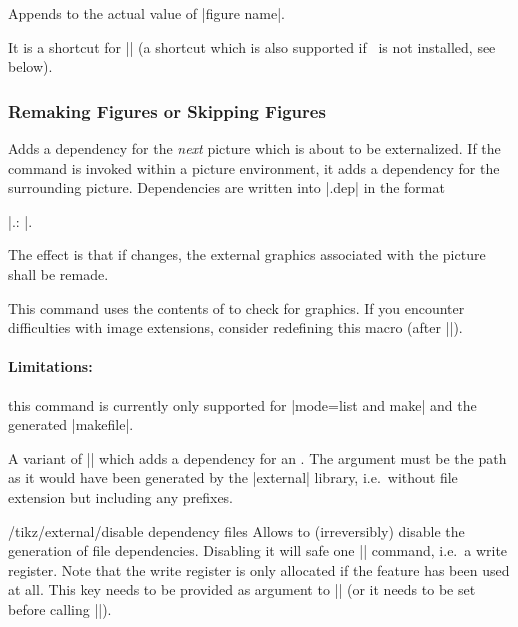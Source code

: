 {\begin{command}{\tikzappendtofigurename{}}
    Appends  to the actual value of |figure name|.

    It is a shortcut for ||
    (a shortcut which is also supported if \tikzname\ is not installed, see
    below).
\end{command}


\subsubsection{Remaking Figures or Skipping Figures}

\begin{command}{\tikzpicturedependsonfile{}}
    Adds a dependency for the \emph{next} picture which is about to be
    externalized. If the command is invoked within a picture environment, it
    adds a dependency for the surrounding picture. Dependencies are written
    into |.dep| in the format

    |.\tikzexternalimgextension: |.

    The effect is that if  changes, the external graphics
    associated with the picture shall be remade.

    This command uses the contents of
    \declareandlabel{\tikzexternalimgextension} to check for graphics. If you
    encounter difficulties with image extensions, consider redefining this
    macro (after |\tikzexternalize|).

    \paragraph{Limitations:}
    this command is currently only supported for |mode=list and make| and the
    generated |makefile|.
\end{command}

\begin{command}{\tikzexternalfiledependsonfile{}}
    A variant of |\tikzpicturedependsonfile| which adds a dependency for an
    . The argument  must be the
    path as it would have been generated by the |external| library, i.e.\ without
    file extension but including any prefixes.
\end{command}

\begin{key}{/tikz/external/disable dependency files}
    Allows to (irreversibly) disable the generation of file dependencies.
    Disabling it will safe one |\newwrite| command, i.e.\ a write register.
    Note that the write register is only allocated if the feature has been used
    at all. This key needs to be provided as argument to |\tikzexternalize| (or
    it needs to be set before calling |\tikzexternalize|).


\end{key}}
